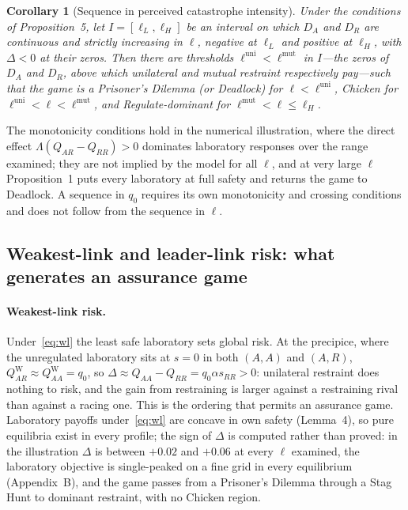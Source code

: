 \documentclass[11pt]{article}
\theoremstyle{plain}
\newtheorem{corollary}{Corollary}
\theoremstyle{definition}
\theoremstyle{remark}
\newcommand{\Lam}{\Lambda}
\newcommand{\Delt}{\Delta}
\begin{document}
\begin{corollary}[Sequence in perceived catastrophe intensity]
Under the conditions of Proposition~5, let $I=[\ell_L,\ell_H]$ be an interval on which $D_A$ and $D_R$ are continuous and strictly increasing in $\ell$, negative at $\ell_L$ and positive at $\ell_H$, with $\Delt<0$ at their zeros. Then there are thresholds $\ell^{\mathrm{uni}}<\ell^{\mathrm{mut}}$ in $I$---the zeros of $D_A$ and $D_R$, above which unilateral and mutual restraint respectively pay---such that the game is a Prisoner's Dilemma (or Deadlock) for $\ell<\ell^{\mathrm{uni}}$, Chicken for $\ell^{\mathrm{uni}}<\ell<\ell^{\mathrm{mut}}$, and Regulate-dominant for $\ell^{\mathrm{mut}}<\ell\le\ell_H$.
\end{corollary}

The monotonicity conditions hold in the numerical illustration, where the direct effect $\Lam(Q_{AR}-Q_{RR})>0$ dominates laboratory responses over the range examined; they are not implied by the model for all $\ell$, and at very large $\ell$ Proposition~1 puts every laboratory at full safety and returns the game to Deadlock. A sequence in $q_0$ requires its own monotonicity and crossing conditions and does not follow from the sequence in $\ell$.

\subsection{Weakest-link and leader-link risk: what generates an assurance game}

\paragraph{Weakest-link risk.} Under~\eqref{eq:wl} the least safe laboratory sets global risk. At the precipice, where the unregulated laboratory sits at $s=0$ in both $(A,A)$ and $(A,R)$, $Q^{\mathrm{W}}_{AR}\approx Q^{\mathrm{W}}_{AA}=q_0$, so $\Delt\approx Q_{AA}-Q_{RR}=q_0\alpha s_{RR}>0$: unilateral restraint does nothing to risk, and the gain from restraining is larger against a restraining rival than against a racing one. This is the ordering that permits an assurance game. Laboratory payoffs under~\eqref{eq:wl} are concave in own safety (Lemma~4), so pure equilibria exist in every profile; the sign of $\Delt$ is computed rather than proved: in the illustration $\Delt$ is between $+0.02$ and $+0.06$ at every $\ell$ examined, the laboratory objective is single-peaked on a fine grid in every equilibrium (Appendix~B), and the game passes from a Prisoner's Dilemma through a Stag Hunt to dominant restraint, with no Chicken region.
\end{document}
